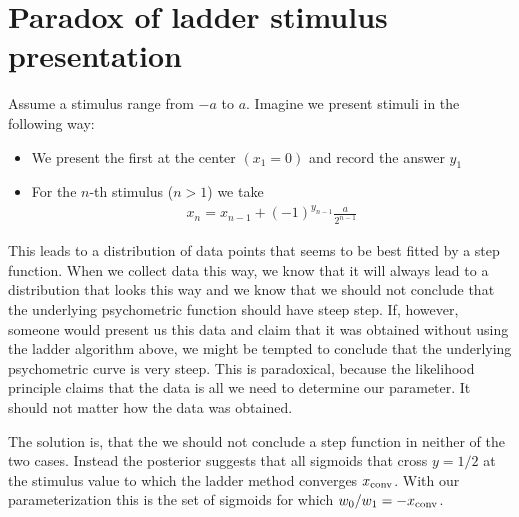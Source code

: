 \section{Paradox of ladder stimulus presentation} %
\label{sec:paradox_of_ladder_stimulus_presentation}

Assume a stimulus range from $-a$ to $a$. Imagine we present stimuli in the following way:
\begin{itemize}
	\item We present the first at the center $(x_1=0)$ and record the answer $y_1$
	\item For the $n$-th stimulus ($n>1$) we take
	\begin{align}
		x_n = x_{n-1} + (-1)^{y_{n-1}} \frac{a}{2^{n-1}}
	\end{align}
\end{itemize}
This leads to a distribution of data points that seems to be best fitted by a step function. When we collect data this way, we know that it will always lead to a distribution that looks this way and we know that we should not conclude that the underlying psychometric function should have steep step. If, however, someone would present us this data and claim that it was obtained without using the ladder algorithm above, we might be tempted to conclude that the underlying psychometric curve is very steep. This is paradoxical, because the likelihood principle claims that the data is all we need to determine our parameter. It should not matter how the data was obtained.

The solution is, that the we should not conclude a step function in neither of the two cases. Instead the posterior suggests that all sigmoids that cross $y=1/2$ at the stimulus value to which the ladder method converges $x_{\mathrm{conv}}$.
With our parameterization this is the set of sigmoids for which $w_0/w_1 = - x_{\mathrm{conv}}$.

